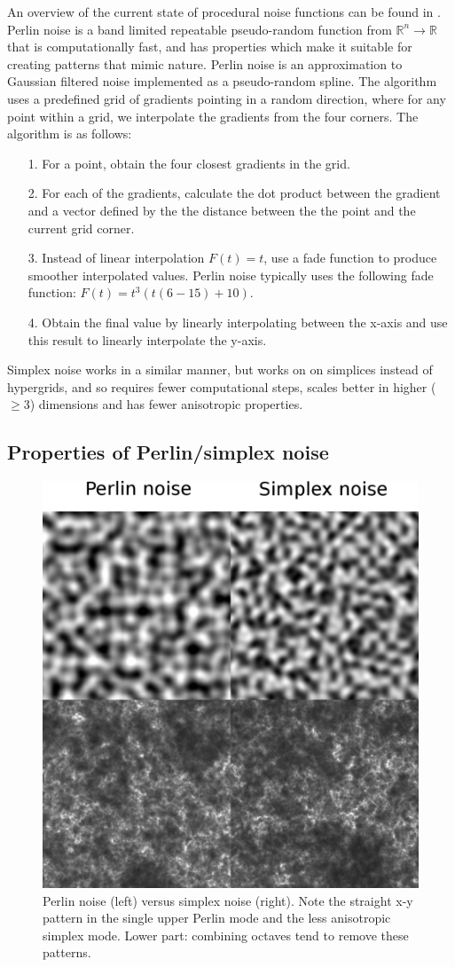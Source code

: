 \documentclass[aps,pre,twocolumn,letterpaper,floatfix,showpacs]{revtex4}
\begin{document}
An overview of the current state of procedural noise functions can be
found in \cite{lagae:2010}. Perlin noise is a band limited repeatable pseudo-random function
from $\mathbb R^n \to \mathbb R$ that is computationally fast, and has
properties which make it suitable for creating patterns that mimic
nature. Perlin noise is an approximation to Gaussian filtered noise
implemented as a pseudo-random spline. The algorithm uses a predefined
grid of gradients pointing in a random direction, where for any point
within a grid, we interpolate the gradients from the four corners. The
algorithm is as follows:
\begin{itemize}
  \item[1.] For a point, obtain the four closest gradients in the grid.
   \item [2.] For each of the gradients, calculate the dot product
     between the gradient and a vector defined by the  the distance
     between the the point and the current grid corner. 
   \item [3.] Instead of linear interpolation $F(t) = t$, use a fade function to produce smoother interpolated values. Perlin noise typically uses the following fade function: $F(t) = t ^3 (t  (6 - 15) + 10)$.
    \item [4.] Obtain the final value by linearly interpolating between the x-axis and
      use this result to linearly interpolate the y-axis. 
\end{itemize} 
Simplex noise works in a similar manner, but works on on simplices instead of hypergrids, and so requires fewer computational steps, scales better in higher ($\ge 3$) dimensions and has fewer anisotropic properties. 

\subsection{Properties of Perlin/simplex noise}
\begin{figure}
\includegraphics[width=.5\textwidth]{noise.eps}
\caption{Perlin noise (left) versus simplex noise (right). Note the
  straight x-y pattern in the single upper Perlin mode and the less
  anisotropic simplex mode. Lower part: combining octaves tend
  to remove these patterns.}
\label{fig:noise}
\end{figure}
\end{document}

